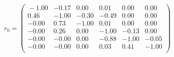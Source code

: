 \documentclass[10pt,a4paper]{article}
\begin{document}
 \begin{equation*} r_0  =  %
\begin{pmatrix}{}
  -1.00 & -0.17 & 0.00 & 0.01 & 0.00 & 0.00 \\ 
  0.46 & -1.00 & -0.30 & -0.49 & 0.00 & 0.00 \\ 
  -0.00 & 0.73 & -1.00 & 0.01 & 0.00 & 0.00 \\ 
  -0.00 & 0.26 & 0.00 & -1.00 & -0.13 & 0.00 \\ 
  -0.00 & -0.00 & 0.00 & -0.88 & -1.00 & -0.05 \\ 
  -0.00 & -0.00 & 0.00 & 0.03 & 0.41 & -1.00 \\ 
  \end{pmatrix}
 \end{equation*} 
\end{document}
